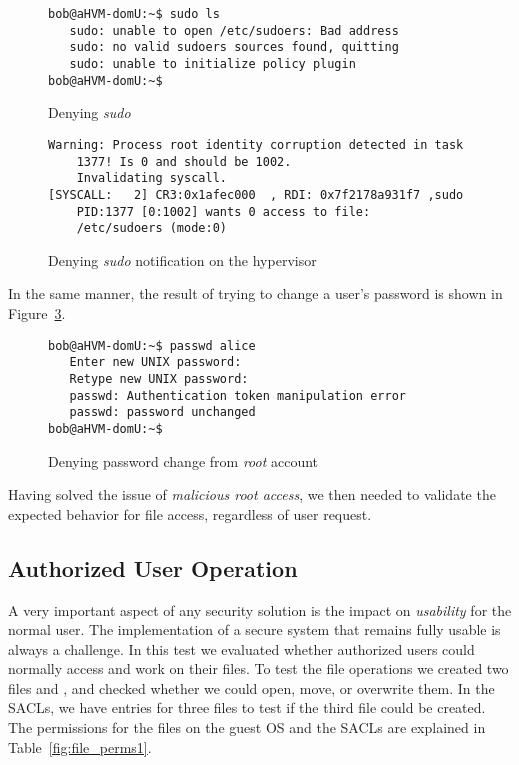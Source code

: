 \begin{figure}[ht]
	\centering
	\footnotesize{\selectfont 
		\begin{lstlisting}
bob@aHVM-domU:~$ sudo ls
   sudo: unable to open /etc/sudoers: Bad address
   sudo: no valid sudoers sources found, quitting
   sudo: unable to initialize policy plugin
bob@aHVM-domU:~$
		\end{lstlisting}}
	\caption{Denying \emph{sudo}}
	\label{fig:sudo_deny}
\end{figure}

\begin{figure}[ht]
	\centering
	\footnotesize{\selectfont 
		\begin{lstlisting}
Warning: Process root identity corruption detected in task 
	1377! Is 0 and should be 1002. 
	Invalidating syscall.
[SYSCALL:   2] CR3:0x1afec000  , RDI: 0x7f2178a931f7 ,sudo 
	PID:1377 [0:1002] wants 0 access to file: 
	/etc/sudoers (mode:0)
		\end{lstlisting}}
	\caption{Denying \emph{sudo} notification on the hypervisor}
	\label{fig:sudo_deny_not}
\end{figure}

\par In the same manner, the result of trying to change a user's password is shown in Figure~\ref{fig:passwd_deny}.

\begin{figure}[ht]
	\centering
	\footnotesize{\selectfont 
		\begin{lstlisting}
bob@aHVM-domU:~$ passwd alice
   Enter new UNIX password:
   Retype new UNIX password:
   passwd: Authentication token manipulation error
   passwd: password unchanged
bob@aHVM-domU:~$
		\end{lstlisting}}
	\caption{Denying password change from \emph{root} account}
	\label{fig:passwd_deny}
\end{figure}


\par Having solved the issue of \emph{malicious root access}, we then needed to validate the expected behavior for file access, regardless of  user request.

\subsection{Authorized User Operation}

\par A very important aspect of any security solution is the impact on \emph{usability} for the normal user. The implementation of a secure system that remains fully usable is always a challenge. In this test we evaluated whether authorized users could normally access and work on their files. To test the file operations we created two files  and , and checked whether we could open, move, or overwrite them. In the \acp{SACL}, we have entries for three files to test if the third file could be created. The permissions for the files on the guest \ac{OS} and the \acp{SACL} are explained in Table~\ref{fig:file_perms1}.

